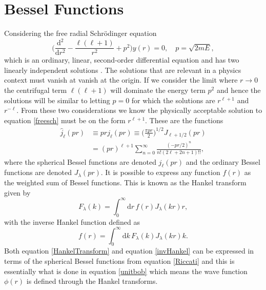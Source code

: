 \section{Bessel Functions}\label{app:Besselfunctions}
Considering the free radial Schrödinger equation
\begin{equation} \label{freesch}
		\bigg( \frac{\text{d}^2}{\text{d}r^2}-\frac{\ell(\ell+1)}{r^2}+p^2\bigg)y(r) = 0, \quad p=\sqrt{2mE},
\end{equation}
which is an ordinary, linear, second-order differential equation and has two linearly independent solutions \cite{TaylorScattering}. The solutions that are relevant in a physics context must vanish at vanish at the origin. If we consider the limit where $r\rightarrow0$ the centrifugal term $\ell(\ell+1)$ will dominate the energy term $p^2$ and hence the solutions will be similar to letting $p=0$ for which the solutions are $r^{\ell+1}$ and $r^{-\ell}$. From these two considerations we know the physically acceptable solution to equation \eqref{freesch} must be on the form $r^{\ell+1}$. These are the functions
\begin{align} \label{Riccati}
		\hat{j}_\ell(pr) &\equiv prj_\ell(pr) \equiv \bigg(\frac{\pi pr}{2} \bigg)^{1/2} J_{\ell+1/2}(pr) \\
		&=(pr)^{\ell+1}\sum_{n=0}^\infty \frac{(-pr/2)^n}{n!(2\ell+2n+1)!!},
\end{align}
where the spherical Bessel functions are denoted $j_\ell(pr)$ and the ordinary Bessel functions are denoted $J_\lambda(pr)$. It is possible to express any function $f(r)$ as the weighted sum of Bessel functions. This is known as the Hankel transform given by
\begin{equation} \label{HankelTransform}
	F_\lambda(k) = \int_0^\infty \text{d}r \, f(r) J_\lambda(kr)r,
\end{equation}
with the inverse Hankel function defined as 
\begin{equation} \label{invHankel}
	f(r) = \int_0^\infty \text{d}k \, F_\lambda(k)J_\lambda(kr)k.
\end{equation}
Both equation \eqref{HankelTransform} and equation \eqref{invHankel} can be expressed in terms of the spherical Bessel functions from equation \eqref{Riccati} and this is essentially what is done in equation \eqref{unitbob} which means the wave function $\phi(r)$ is defined through the Hankel transforms.
